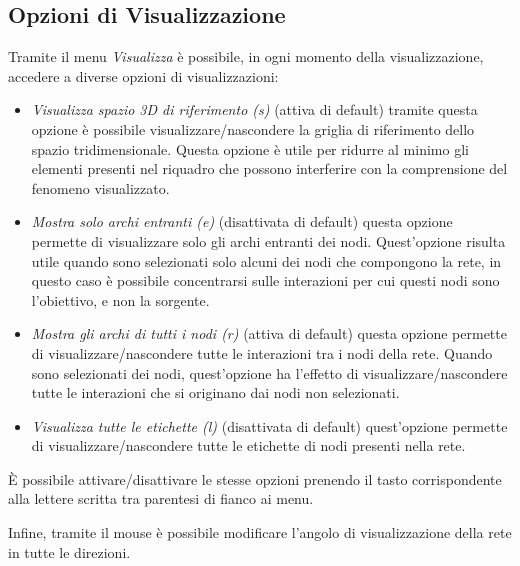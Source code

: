 \documentclass[a4paper,12pt]{article}
\begin{document}
\subsection{Opzioni di Visualizzazione}
Tramite il menu \textit{Visualizza} \`e possibile, in ogni momento della visualizzazione, accedere a diverse opzioni di visualizzazioni:
\begin{itemize}
 \item \textit{Visualizza spazio 3D di riferimento (s)} (attiva di default) tramite questa opzione \`e possibile visualizzare/nascondere la griglia di riferimento dello spazio tridimensionale. Questa opzione \`e utile per ridurre al minimo gli elementi presenti nel riquadro che possono interferire con la comprensione del fenomeno visualizzato.
 \item \textit{Mostra solo archi entranti (e)} (disattivata di default) questa opzione permette di visualizzare solo gli archi entranti dei nodi. Quest'opzione risulta utile quando sono selezionati solo alcuni dei nodi che compongono la rete, in questo caso \`e possibile concentrarsi sulle interazioni per cui questi nodi sono l'obiettivo, e non la sorgente.
 \item \textit{Mostra gli archi di tutti i nodi (r)} (attiva di default) questa opzione permette di visualizzare/nascondere tutte le interazioni tra i nodi della rete. Quando sono selezionati dei nodi, quest'opzione ha l'effetto di visualizzare/nascondere tutte le interazioni che si originano dai nodi non selezionati.
 \item \textit{Visualizza tutte le etichette (l)} (disattivata di default) quest'opzione permette di visualizzare/nascondere tutte le etichette di nodi presenti nella rete.
\end{itemize}
\`E possibile attivare/disattivare le stesse opzioni prenendo il tasto corrispondente alla lettere scritta tra parentesi di fianco ai menu.


Infine, tramite il mouse \`e possibile modificare l'angolo di visualizzazione della rete in tutte le direzioni.
\end{document}
